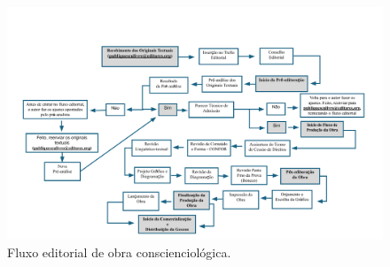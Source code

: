 \documentclass{gescons}
\begin{document}



\begin{figure}[h]
  \centering
  \caption*{Fluxo editorial de obra conscienciológica.} %
  \includegraphics[width=18cm]{articles/resumo/fotos/fluxo-editorial/fluxo-editorial-artigo}
\end{figure}


        
\end{document}
